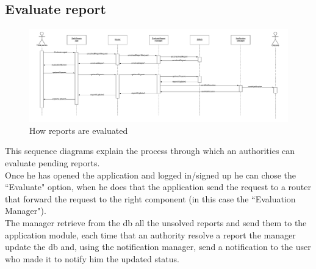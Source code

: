 \documentclass[12pt,a4paper]{report}
\begin{document}
			\subsection{Evaluate report}
				\begin{figure}[H]
						\includegraphics[width = \textwidth, center]{Evaluate}
						\caption{How reports are evaluated}
						\label{fig: diagrams}
				\end{figure}
				This sequence diagrams explain the process through which an authorities can evaluate pending reports.\\
				Once he has opened the application and logged in/signed up he can chose the ``Evaluate" option,
				when he does that the application send the request to a router that forward the request to the right
				component (in this case the ``Evaluation Manager").\\
				The manager retrieve from the db all the unsolved reports and send them to the application module, each
				time that an authority resolve a report the manager update the db and, using the notification manager, send
				a notification to the user who made it to notify him the updated status.
\end{document}

